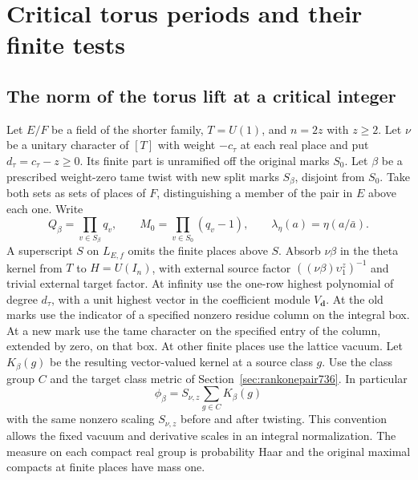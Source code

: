 \documentclass[a4paper,11pt]{article}
\theoremstyle{definition}
\theoremstyle{remark}
\numberwithin{equation}{section}
\begin{document}
\section{Critical torus periods and their finite tests}\label{nav:critical-torus-tests}

\subsection{The norm of the torus lift at a critical integer}
\label{sec:torusnorm852}
Let \(E/F\) be a field of the shorter family, \(T=U(1)\), and
\(n=2z\) with \(z\ge2\). Let \(\nu\) be a unitary character of
\([T]\) with weight \(-c_\tau\) at each real place and put
\(d_\tau=c_\tau-z\ge0\). Its finite part is unramified off the
original marks \(S_0\). Let \(\beta\) be a prescribed weight-zero
tame twist with new split marks \(S_\beta\), disjoint from \(S_0\).
Take both sets as sets of places of \(F\), distinguishing a member
of the pair in \(E\) above each one. Write
\[
        Q_\beta=\prod_{v\in S_\beta}q_v,\qquad
        M_0=\prod_{v\in S_0}(q_v-1),\qquad
        \lambda_\eta(a)=\eta(a/\bar a).
\]
A superscript \(S\) on \(L_{E,f}\) omits the finite places above
\(S\). Absorb \(\nu\beta\) in the theta kernel from \(T\) to
\(H=U(I_n)\), with external source factor
\(((\nu\beta)\upsilon_1^z)^{-1}\) and trivial external target
factor. At infinity use the one-row highest polynomial of degree
\(d_\tau\), with a unit highest vector in the coefficient module
\(V_{\mathbf d}\). At the old marks use the indicator of a
specified nonzero residue column on the integral box. At a new
mark use the tame character on the specified entry of the
column, extended by zero, on that box. At other finite places
use the lattice vacuum. Let \(K_\beta(g)\) be the resulting
vector-valued kernel at a source class \(g\). Use the class
group \(C\) and the target class metric of
Section~\ref{sec:rankonepair736}. In particular
\[
        \phi_\beta=S_{\nu,z}\sum_{g\in C}K_\beta(g)
\]
with the same nonzero scaling \(S_{\nu,z}\) before and after
twisting. This convention allows the fixed vacuum and derivative
scales in an integral normalization. The measure on each compact
real group is probability Haar and the original maximal compacts
at finite places have mass one.
\end{document}
